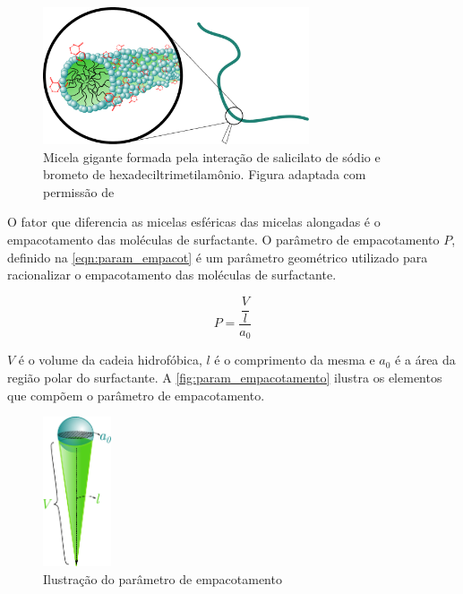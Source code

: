 	\begin{figure}[h]
		\centering
		\includegraphics[width=0.7\textwidth]{./imagens/introducao/micela_gigante}
		\caption{Micela gigante formada pela interação de salicilato de sódio e brometo de hexadeciltrimetilamônio. Figura adaptada com permissão de \citeauthor{WLM_Advances}}
		\label{fig:micela_gigante}
	\end{figure}
	
	O fator que diferencia as micelas esféricas das micelas alongadas é o empacotamento das moléculas de surfactante. O parâmetro de empacotamento \(P\), definido na \autoref{eqn:param_empacot} é um parâmetro geométrico utilizado para racionalizar o empacotamento das moléculas de surfactante.\cite{Israelachvili1976c}
	
	\begin{equation}
	P = \dfrac{\dfrac{V}{l}}{a_0}
	\label{eqn:param_empacot}
	\end{equation} 
	
	\(V\) é o volume da cadeia hidrofóbica, \(l\) é o comprimento da mesma e \(a_0\) é a área da região polar do surfactante. A \autoref{fig:param_empacotamento} ilustra os elementos que compõem o parâmetro de empacotamento.
	
	\begin{figure}[h]
		\centering
		\includegraphics[width=2cm]{imagens/introducao/param_empacotamento}
		\caption{Ilustração do parâmetro de empacotamento}
		\label{fig:param_empacotamento}
	\end{figure}
	
